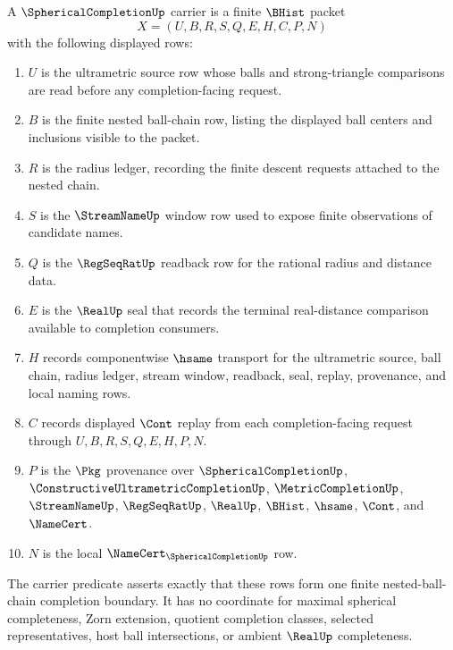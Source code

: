 \begin{definition}
\label{def:spherical-completion-carrier}
A $\SphericalCompletionUp$ carrier is a finite $\BHist$ packet
$$
X=(U,B,R,S,Q,E,H,C,P,N)
$$
with the following displayed rows:
\begin{enumerate}
\item $U$ is the ultrametric source row whose balls and strong-triangle comparisons are read before any completion-facing request.
\item $B$ is the finite nested ball-chain row, listing the displayed ball centers and inclusions visible to the packet.
\item $R$ is the radius ledger, recording the finite descent requests attached to the nested chain.
\item $S$ is the $\StreamNameUp$ window row used to expose finite observations of candidate names.
\item $Q$ is the $\RegSeqRatUp$ readback row for the rational radius and distance data.
\item $E$ is the $\RealUp$ seal that records the terminal real-distance comparison available to completion consumers.
\item $H$ records componentwise $\hsame$ transport for the ultrametric source, ball chain, radius ledger, stream window, readback, seal, replay, provenance, and local naming rows.
\item $C$ records displayed $\Cont$ replay from each completion-facing request through $U,B,R,S,Q,E,H,P,N$.
\item $P$ is the $\Pkg$ provenance over $\SphericalCompletionUp$, $\ConstructiveUltrametricCompletionUp$, $\MetricCompletionUp$, $\StreamNameUp$, $\RegSeqRatUp$, $\RealUp$, $\BHist$, $\hsame$, $\Cont$, and $\NameCert$.
\item $N$ is the local $\NameCert_{\SphericalCompletionUp}$ row.
\end{enumerate}
The carrier predicate asserts exactly that these rows form one finite nested-ball-chain completion boundary. It has no coordinate for maximal spherical completeness, Zorn extension, quotient completion classes, selected representatives, host ball intersections, or ambient $\RealUp$ completeness.
\end{definition}

